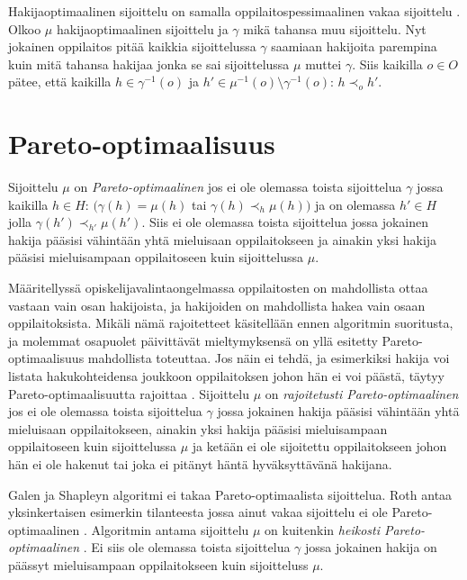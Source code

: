 \documentclass[gradu, twoside]{tktltiki}
\begin{document}
Hakijaoptimaalinen sijoittelu on samalla oppilaitospessimaalinen vakaa
sijoittelu \cite{gusfield89}. Olkoo $\mu$ hakijaoptimaalinen
sijoittelu ja $\gamma$ mikä tahansa muu sijoittelu. Nyt jokainen
oppilaitos pitää kaikkia sijoittelussa $\gamma$ saamiaan hakijoita
parempina kuin mitä tahansa hakijaa jonka se sai sijoittelussa $\mu$
muttei $\gamma$. Siis kaikilla $o \in O$ pätee, että kaikilla $h \in
\gamma^{-1}(o)$ ja $h' \in \mu^{-1}(o) \setminus \gamma^{-1}(o)$: $h
\prec_o h'$.

\section{Pareto-optimaalisuus}

Sijoittelu $\mu$ on \emph{Pareto-optimaalinen} jos ei ole olemassa
toista sijoittelua $\gamma$ jossa kaikilla $h \in H$: $(\gamma(h) =
\mu(h)$ tai $\gamma(h) \prec_h \mu(h))$ ja on olemassa $h' \in H$
jolla $\gamma(h') \prec_{h'} \mu(h')$. Siis ei ole olemassa toista
sijoittelua jossa jokainen hakija pääsisi vähintään yhtä mieluisaan
oppilaitokseen ja ainakin yksi hakija pääsisi mieluisampaan
oppilaitoseen kuin sijoittelussa $\mu$.

Määritellyssä opiskelijavalintaongelmassa oppilaitosten on mahdollista
ottaa vastaan vain osan hakijoista, ja hakijoiden on mahdollista hakea
vain osaan oppilaitoksista. Mikäli nämä rajoitetteet käsitellään ennen
algoritmin suoritusta, ja molemmat osapuolet päivittävät
mieltymyksensä on yllä esitetty Pareto-optimaalisuus mahdollista
toteuttaa. Jos näin ei tehdä, ja esimerkiksi hakija voi listata
hakukohteidensa joukkoon oppilaitoksen johon hän ei voi päästä, täytyy
Pareto-optimaalisuutta rajoittaa \cite{kojima10}. Sijoittelu $\mu$ on
\emph{rajoitetusti Pareto-optimaalinen} jos ei ole olemassa toista
sijoittelua $\gamma$ jossa jokainen hakija pääsisi vähintään yhtä
mieluisaan oppilaitokseen, ainakin yksi hakija pääsisi mieluisampaan
oppilaitoseen kuin sijoittelussa $\mu$ ja ketään ei ole sijoitettu
oppilaitokseen johon hän ei ole hakenut tai joka ei pitänyt häntä
hyväksyttävänä hakijana.

Galen ja Shapleyn algoritmi ei takaa Pareto-optimaalista sijoittelua.
Roth antaa yksinkertaisen esimerkin tilanteesta jossa ainut vakaa
sijoittelu ei ole Pareto-optimaalinen \cite{roth82}. Algoritmin antama
sijoittelu $\mu$ on kuitenkin \emph{heikosti Pareto-optimaalinen}
\cite{gusfield89}. Ei siis ole olemassa toista sijoittelua $\gamma$
jossa jokainen hakija on päässyt mieluisampaan oppilaitokseen kuin
sijoitteluss $\mu$.
\end{document}
